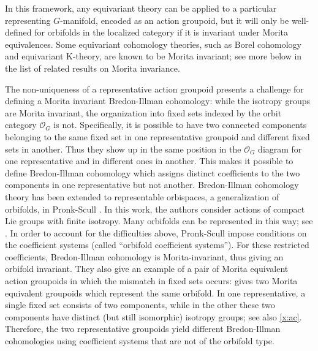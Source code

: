 \documentclass[12pt,reqno]{amsart}
\newcommand{\orbit}{\ensuremath{\mathcal{O}_G}}
\theoremstyle{plain}
\theoremstyle{definition}
\begin{document}
In this framework, any equivariant theory can be applied to a particular representing $G$-manifold, encoded as an action groupoid, but it will only be well-defined for orbifolds in the localized category if it is invariant under Morita equivalences. 
Some equivariant cohomology theories, such as   Borel cohomology  and  equivariant K-theory, are known to be Morita invariant; see more below in the list of related results on Morita invariance. 



The non-uniqueness of a representative action groupoid  presents a challenge for defining a Morita invariant Bredon-Illman cohomology: while the isotropy groups are Morita invariant, the organization into fixed sets indexed by the orbit category $\orbit$ is not.   Specifically, it is possible to have two connected components belonging to the same fixed set in one representative groupoid and different fixed sets in another.   Thus they show up in the same position in the $\orbit$ diagram for one representative and in different ones in another.     This makes it  possible to define Bredon-Illman cohomology  which assigns distinct coefficients to the two components in one representative but not another.  Bredon-Illman cohomology theory has been extended to representable orbispaces, a generalization of orbifolds,  in Pronk-Scull \cite{PS:translation}.   In this work, the authors consider actions of compact Lie groups with finite isotropy.  Many orbifolds can be represented in this way; see \cite{henriques-metzler,pardon}.  In order to account for the difficulties above,  Pronk-Scull impose conditions on the coefficient systems (called ``orbifold coefficient systems'').  For these restricted coefficients,   Bredon-Illman cohomology is Morita-invariant, thus giving an orbifold invariant.  They also give an example of a pair of Morita equivalent action groupoids in which the mismatch in fixed sets occurs:  \cite[Example 5.3]{PS:translation}  gives two Morita equivalent groupoids which represent the same orbifold.    In one representative, a single fixed set consists of two components,  while in the other these two components have distinct (but still isomorphic) isotropy groups;  see also \cref{x:ac}.   Therefore, the two representative groupoids yield different Bredon-Illman cohomologies using coefficient systems that are not of the orbifold type.  
 
\end{document}
